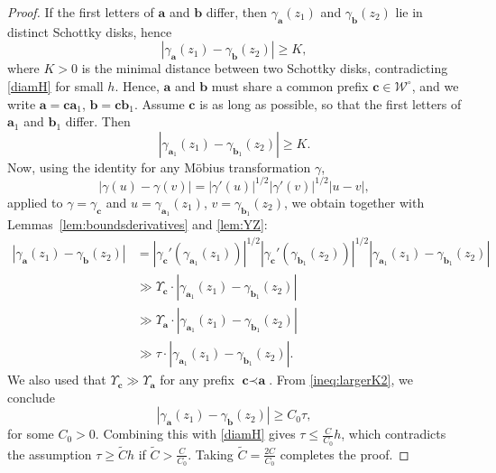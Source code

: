 \documentclass[12pt,letterpaper]{amsart}
\theoremstyle{plain}
\theoremstyle{definition}
\theoremstyle{remark}
\newcommand{\Aa}{\textbf{a}}
\newcommand{\Bb}{\textbf{b}}
\newcommand{\Cc}{\textbf{c}}
\begin{document}
\begin{proof}
If the first letters of $\Aa$ and $\Bb$ differ, then $\gamma_{\Aa}(z_1)$ and $\gamma_{\Bb}(z_2)$ lie in distinct Schottky disks, hence
\[
|\gamma_{\Aa}(z_1) - \gamma_{\Bb}(z_2)| \ge K,
\]
where $K > 0$ is the minimal distance between two Schottky disks, contradicting \eqref{diamH} for small $h$. Hence, $\Aa$ and $\Bb$ must share a common prefix $\Cc \in \mathcal{W}^\circ$, and we write $\Aa = \Cc \Aa_1$, $\Bb = \Cc \Bb_1$. Assume $\Cc$ is as long as possible, so that the first letters of $\Aa_1$ and $\Bb_1$ differ. Then
\begin{equation}\label{ineq:largerK2}
|\gamma_{\Aa_1}(z_1) - \gamma_{\Bb_1}(z_2)| \ge K.
\end{equation}
Now, using the identity for any Möbius transformation $\gamma$,
\[
|\gamma(u) - \gamma(v)| = |\gamma'(u)|^{1/2} |\gamma'(v)|^{1/2} |u - v|,
\]
applied to $\gamma = \gamma_\Cc$ and $u = \gamma_{\Aa_1}(z_1)$, $v = \gamma_{\Bb_1}(z_2)$, we obtain together with Lemmas~\ref{lem:boundsderivatives} and \ref{lem:YZ}:
\begin{align*}
|\gamma_{\Aa}(z_1) - \gamma_{\Bb}(z_2)|
&= |\gamma_\Cc'(\gamma_{\Aa_1}(z_1))|^{1/2} |\gamma_\Cc'(\gamma_{\Bb_1}(z_2))|^{1/2} |\gamma_{\Aa_1}(z_1) - \gamma_{\Bb_1}(z_2)| \\
&\gg \Upsilon_\Cc \cdot |\gamma_{\Aa_1}(z_1) - \gamma_{\Bb_1}(z_2)| \\
&\gg \Upsilon_\Aa \cdot |\gamma_{\Aa_1}(z_1) - \gamma_{\Bb_1}(z_2)| \\
&\gg \tau \cdot |\gamma_{\Aa_1}(z_1) - \gamma_{\Bb_1}(z_2)|.
\end{align*}
We also used that $\Upsilon_\Cc \gg \Upsilon_\Aa$ for any prefix $\Cc \prec \Aa$. From \eqref{ineq:largerK2}, we conclude
\[
|\gamma_{\Aa}(z_1) - \gamma_{\Bb}(z_2)| \ge C_0 \tau,
\]
for some $C_0 > 0$. Combining this with \eqref{diamH} gives $\tau \le \frac{C}{C_0} h$, which contradicts the assumption $\tau \ge \widetilde{C} h$ if $\widetilde{C} > \frac{C}{C_0}$. Taking $\widetilde{C} = \frac{2C}{C_0}$ completes the proof.
\end{proof}
\end{document}
